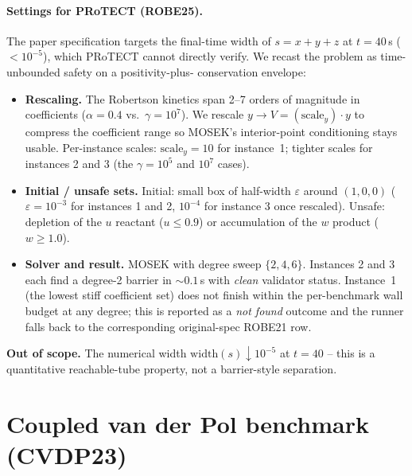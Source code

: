 \documentclass[11pt,a4paper]{article}
\newcommand{\settings}[1]{\paragraph{Settings for PRoTECT (#1).}}
\begin{document}
\settings{ROBE25}
The paper specification targets the final-time width of $s = x+y+z$ at
$t = 40\,$s ($< 10^{-5}$), which PRoTECT cannot directly verify. We
recast the problem as time-unbounded safety on a positivity-plus-
conservation envelope:
\begin{itemize}
  \item \textbf{Rescaling.} The Robertson kinetics span 2--7 orders of
        magnitude in coefficients ($\alpha = 0.4$ vs.\ $\gamma = 10^7$).
        We rescale $y \to V = (\mathrm{scale}_y) \cdot y$ to compress the
        coefficient range so MOSEK's interior-point conditioning stays
        usable. Per-instance scales: $\mathrm{scale}_y = 10$ for
        instance~1; tighter scales for instances 2 and 3 (the
        $\gamma = 10^5$ and $10^7$ cases).
  \item \textbf{Initial / unsafe sets.} Initial: small box of half-width
        $\varepsilon$ around $(1, 0, 0)$ ($\varepsilon = 10^{-3}$ for
        instances 1 and 2, $10^{-4}$ for instance 3 once rescaled).
        Unsafe: depletion of the $u$ reactant ($u \le 0.9$) or
        accumulation of the $w$ product ($w \ge 1.0$).
  \item \textbf{Solver and result.} MOSEK with degree sweep $\{2, 4, 6\}$.
        Instances 2 and 3 each find a degree-2 barrier in $\sim 0.1\,$s
        with \emph{clean} validator status. Instance~1 (the lowest stiff
        coefficient set) does not finish within the per-benchmark wall
        budget at any degree; this is reported as a \emph{not found}
        outcome and the runner falls back to the corresponding
        original-spec ROBE21 row.
\end{itemize}
\textbf{Out of scope.} The numerical width
$\mathrm{width}(s)\!\downarrow\! 10^{-5}$ at $t = 40$ -- this is a
quantitative reachable-tube property, not a barrier-style separation.

\section{Coupled van der Pol benchmark (CVDP23)}
\end{document}
